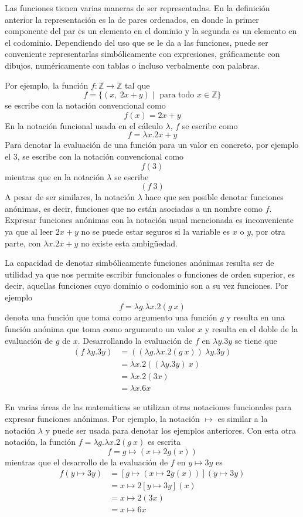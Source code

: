 Las funciones tienen varias maneras de ser representadas. En la definición anterior la representación es la de pares ordenados, en donde la primer componente del par es un elemento en el dominio y la segunda es un elemento en el codominio. Dependiendo del uso que se le da a las funciones, puede ser conveniente representarlas simbólicamente con expresiones, gráficamente con dibujos, numéricamente con tablas o incluso verbalmente con palabras.

Por ejemplo, la función \( f : \mathbb{Z} \to \mathbb{Z} \) tal que \[ f = \{ (x,\ 2x+y) \mid \text{ para todo } x\in\mathbb{Z} \} \] se escribe con la notación convencional como \[ f(x) = 2x+y \] En la notación funcional usada en el cálculo \( λ \), \( f \) se escribe como \[ f = λx.2x+y \] Para denotar la evaluación de una función para un valor en concreto, por ejemplo el \( 3 \), se escribe con la notación convencional como \[ f(3) \] mientras que en la notación \( λ \) se escribe \[ (f\ 3) \] A pesar de ser similares, la notación \( λ \) hace que sea posible denotar funciones anónimas, es decir, funciones que no están asociadas a un nombre como \( f \). Expresar funciones anónimas con la notación usual mencionada es inconveniente ya que al leer \( 2x+y \) no se puede estar seguros si la variable es \( x \) o \( y \), por otra parte, con \( λx.2x+y \) no existe esta ambigüedad.

La capacidad de denotar simbólicamente funciones anónimas resulta ser de utilidad ya que nos permite escribir funcionales o funciones de orden superior, es decir, aquellas funciones cuyo dominio o codominio son a su vez funciones. Por ejemplo \[ f = λg.λx.2(g\ x) \] denota una función que toma como argumento una función \( g \) y resulta en una función anónima que toma como argumento un valor \( x \) y resulta en el doble de la evaluación de \( g \) de \( x \). Desarrollando la evaluación de \( f \) en \( λy.3y \) se tiene que
\begin{align*}
(f\ λy.3y) 	&= ((λg.λx.2(g\ x))\ λy.3y) \\
			&= λx.2((λy.3y)\ x) \\
            &= λx.2(3x) \\
            &= λx.6x
\end{align*}

En varias áreas de las matemáticas se utilizan otras notaciones funcionales para expresar funciones anónimas. Por ejemplo, la notación \( \mapsto \) es similar a la notación \( λ \) y puede ser usada para denotar los ejemplos anteriores. Con esta otra notación, la función \( f = λg.λx.2(g\ x) \) es escrita \[ f = g \mapsto (x \mapsto 2g(x)) \] mientras que el desarrollo de la evaluación de \( f \) en \( y \mapsto 3y \) es
\begin{align*}
f(y \mapsto 3y) 	&= [g \mapsto (x \mapsto 2g(x))](y \mapsto 3y) \\
					&= x \mapsto 2[y \mapsto 3y](x) \\
            		&= x \mapsto 2(3x) \\
            		&= x \mapsto 6x
\end{align*}

